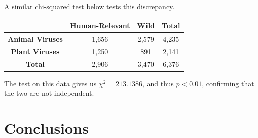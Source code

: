 \documentclass[12pt]{article}
\begin{document}

    A similar chi-squared test below tests this discrepancy.

    \begin{table}[H]
        \begin{tabular}{|c|c|c|c|}
        \hline
                                & \textbf{Human-Relevant} & \textbf{Wild} & \textbf{Total} \\ \hline
        \textbf{Animal Viruses} & 1,656                   & 2,579         & 4,235          \\ \hline
        \textbf{Plant Viruses}  & 1,250                   & 891           & 2,141          \\ \hline
        \textbf{Total}          & 2,906                   & 3,470         & 6,376          \\ \hline
        \end{tabular}
        \end{table}

    The test on this data gives us $\chi^2 = 213.1386$, and thus $p < 0.01$,
    confirming that the two are not independent.

    \section{Conclusions}
    
\end{document}
